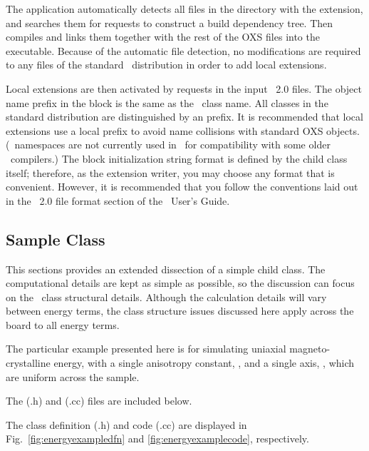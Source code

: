 The  application automatically detects all files in the
 directory with the  extension, and searches
them for  requests to construct a build dependency tree.
Then  compiles and links them together with the rest of the
OXS files into the  executable.  Because of the automatic file
detection, no modifications are required to any files of the standard
\OOMMF\ distribution in order to add local extensions.

Local extensions are then activated by  requests in the
input \MIF~2.0 files.  The object name prefix in the  block
is the same as the \Cplusplus\ class name.  All  classes in
the standard distribution are distinguished by an  prefix.  It
is recommended that local extensions use a local prefix to avoid name
collisions with standard OXS objects.  (\Cplusplus\ namespaces are not
currently used in \OOMMF\ for compatibility with some older \Cplusplus\
compilers.)  The  block initialization string format is
defined by the \cd{Oxs\_Ext} child class itself; therefore, as the
extension writer, you may choose any format that is convenient.
However, it is recommended that you follow the conventions laid out in
the \MIF~2.0 file format section of the \OOMMF\ User's Guide.


\subsection{Sample  Class}\label{sec:energyexample}
This sections provides an extended dissection of a simple
\cd{Oxs\_Energy} child class.  The computational details are kept as
simple as possible, so the discussion can focus on the \Cplusplus\ class
structural details.  Although the calculation details will vary between
energy terms, the class structure issues discussed here apply across the
board to all energy terms.

The particular example presented here is for simulating
uniaxial magneto-crystalline energy, with a single anisotropy constant,
\cd{K1}, and a single axis, \cd{axis}, which are uniform across the
sample.
\begin{htmlonly}
The  (.h) and
 (.cc) files are included below.
\end{htmlonly}
\begin{latexonly}
The class definition (.h) and code (.cc) are displayed in
Fig.~\ref{fig:energyexampledfn} and \ref{fig:energyexamplecode},
respectively.
\end{latexonly}

